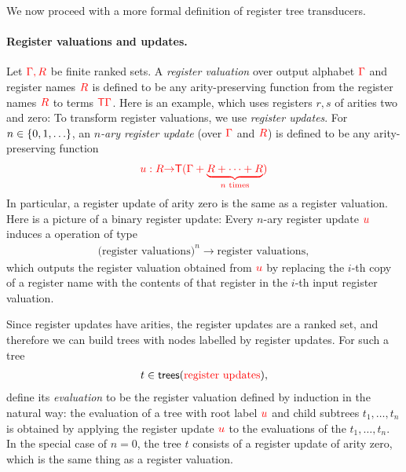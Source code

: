 

We now proceed with a more formal definition of register tree transducers.

\paragraph*{Register valuations and updates.}   Let ${\color{red}{\Gamma, R}}$ be finite ranked sets.
A \emph{register valuation} over output alphabet ${\color{red}{\Gamma}}$ and register names ${\color{red}{R}}$ is defined to be any arity-preserving function from the register names ${{\color{red}{R}}}$ to terms ${\color{red}{\mathsf T}} {\color{red}{\Gamma}}$. Here is an example, which uses registers $r,s$ of arities two and zero:
To transform register valuations, we use \emph{register updates}.  For  $n \in \{0,1,\ldots\}$, an \emph{$n$-ary register update} (over ${\color{red}{\Gamma}}$ and ${\color{red}{R}}$) is defined to be any arity-preserving function
\begin{align}\label{eq:reg-operation}
    {\color{red}{u : {{\color{red}{R}}}{\color{red}{\to}}{\color{red}{\mathsf T}}( {\color{red}{\Gamma}}+ \underbrace{{{{\color{red}{R}}}+ \cdots + {{\color{red}{R}}}}}_{\text{$n$ times}})}}
\end{align}
In particular, a register update of arity zero is the same as a register valuation.
Here is a picture of a binary register update:
Every $n$-ary register update ${\color{red}{u}}$ induces a operation of type 
\begin{align*}
\text{(register valuations)}^n \to \text{register valuations},
\end{align*}
which outputs the register valuation obtained from ${\color{red}{u}}$ by replacing  the $i$-th copy of a register name with the  contents of that register in the $i$-th input register valuation. 

Since register updates have arities, the register updates are a ranked set, and therefore  we can build trees  with nodes labelled by register updates. For such a  tree 
\begin{align*}
    t \in  \mathsf {trees}({\color{red}{\text{register updates}}}),
\end{align*}
define its \emph{evaluation} to be the register valuation defined by induction in the natural way: the evaluation of a tree with root label ${\color{red}{u}}$ and child subtrees $t_1,\ldots,t_n$ is obtained  by applying the register update ${\color{red}{u}}$ to the evaluations of the $t_1,\ldots, t_n$. In the special case of $n=0$, the tree $t$ consists of a register update of arity zero, which is the same thing as a register valuation. 

